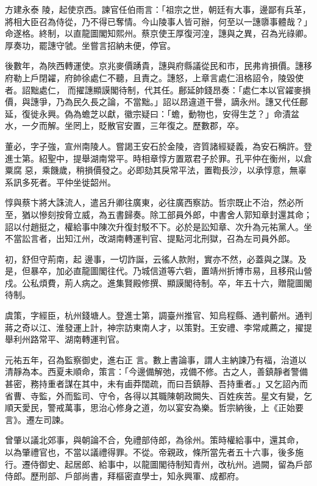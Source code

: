 \begin{pinyinscope}
 方建永泰
 陵，起使京西。諫官任伯雨言：「祖宗之世，朝廷有大事，邊鄙有兵革，將相大臣召為侍從，乃不得已奪情。今山陵事人皆可辦，何至以一譓隳事體哉？」命遂格。終制，以直龍圖閣知熙州。蔡京使王厚復河湟，譓與之異，召為光祿卿。厚奏功，罷譓守虢。坐嘗言招納未便，停官。



 後數年，為陜西轉運使。京兆麥價踴貴，譓與府縣議從民和市，民弗肯損價。譓移府勒上戶閉糴，府帥徐處仁不聽，且責之。譓怒，上章言處仁沮格詔令，陵毀使者。詔黜處仁，
 而擢譓顯謨閣待制，代其任。鄜延帥錢昂奏：「處仁本以官糴麥損價，與譓爭，乃為民久長之論，不當黜。」詔以昂違道干譽，謫永州。譓又代任鄜延，復徙永興。偽為蟾芝以獻，徽宗疑曰：「蟾，動物也，安得生芝？」命漬盆水，一夕而解。坐罔上，貶散官安置，三年復之。歷數郡，卒。



 董必，字子強，宣州南陵人。嘗謁王安石於金陵，咨質諸經疑義，為安石稱許。登進士第。紹聖中，提舉湖南常平。時相章惇方置眾君子於罪。孔平仲在衡州，以倉粟腐
 惡，乘饑歲，稍損價發之。必即劾其戾常平法，置鞫長沙，以承惇意，無辜系訊多死者。平仲坐徙韶州。



 惇與蔡卞將大誅流人，遣呂升卿往廣東，必往廣西察訪。哲宗既止不治，然必所至，猶以慘刻按脅立威，為五書歸奏。除工部員外郎，中書舍人郭知章封還其命；詔以付趙挺之，權給事中陳次升復封駁不下。必於是訟知章、次升為元祐黨人。坐不當訟言者，出知江州，改湖南轉運判官、提點河北刑獄，召為左司員外郎。



 初，舒但守荊南，起
 邊事，一切詐誕，云徭人款附，實亦不然，必蓋與之謀。及是，但暴卒，加必直龍圖閣往代。乃城信道等六砦，置靖州折博市易，且移飛山營戍。公私煩費，荊人病之。進集賢殿修撰、顯謨閣待制。卒，年五十六，贈龍圖閣待制。



 虞策，字經臣，杭州錢塘人。登進士第，調臺州推官、知烏程縣、通判蘄州。通判蔣之奇以江、淮發運上計，神宗訪東南人才，以策對。王安禮、李常咸薦之，擢提舉利州路常平、湖南轉運判官。



 元祐五年，召為監察御史，進右正
 言。數上書論事，謂人主納諫乃有福，治道以清靜為本。西夏未順命，策言：「今邊備解弛，戎備不修。古之人，善鎮靜者警備甚密，務持重者謀在其中，未有鹵莽闊疏，而曰吾鎮靜、吾持重者。」又乞詔內而省曹、寺監，外而監司、守令，各得以其職陳朝政闕失、百姓疾苦。星文有變，乞順天愛民，警戒萬事，思治心修身之道，勿以宴安為樂。哲宗納後，上《正始要言》。遷左司諫。



 曾肇以議北郊事，與朝論不合，免禮部侍郎，為徐州。策時權給事中，還其命，
 以為肇禮官也，不當以議禮得罪。不從。帝親政，條所當先者五十六事，後多施行。遷侍御史、起居郎、給事中，以龍圖閣待制知青州，改杭州。過闕，留為戶部侍郎。歷刑部、戶部尚書，拜樞密直學士，知永興軍、成都府。




\end{pinyinscope}

